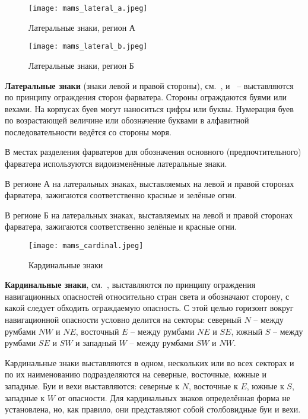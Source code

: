 \begin{figure}[htb]
  \centering{}
  \texttt{[image: mams\_lateral\_a.jpeg]}
  \caption{Латеральные знаки, регион А}
  \label{fig:mams-lateral-a}
\end{figure}

\begin{figure}[htb]
  \centering{}
  \texttt{[image: mams\_lateral\_b.jpeg]}
  \caption{Латеральные знаки, регион Б}
  \label{fig:mams-lateral-b}
\end{figure}

\textbf{Латеральные знаки} (знаки левой и
правой стороны), см.~, 
и~ \--- выставляются по принципу ограждения
сторон фарватера.  Стороны ограждаются буями или вехами. На корпусах
буев могут наноситься цифры или буквы. Нумерация буев по возрастающей
величине или обозначение буквами в алфавитной последовательности
ведётся со стороны моря.

В местах разделения фарватеров для обозначения основного
(предпочтительного) фарватера используются видоизменённые латеральные
знаки.

В регионе А на латеральных знаках, выставляемых на левой и правой
сторонах фарватера, зажигаются соответственно красные и зелёные огни.

В регионе Б на латеральных знаках, выставляемых на левой и правой
сторонах фарватера, зажигаются соответственно зелёные и красные огни.

\begin{figure}[htb]
  \centering{}
  \texttt{[image: mams\_cardinal.jpeg]}
  \caption{Кардинальные знаки}
  \label{fig:mams-cardinal}
\end{figure}

\textbf{Кардинальные знаки},
см.~, выставляются по принципу ограждения
навигационных опасностей относительно стран света и обозначают
сторону, с какой следует обходить ограждаемую опасность. С этой целью
горизонт вокруг навигационной опасности условно делится на секторы:
северный $N$ \--- между румбами $NW$ и $NE$, восточный $E$ \--- между румбами
$NE$ и $SE$, южный $S$ \--- между румбами $SE$ и $SW$ и западный $W$ \--- между
румбами $SW$ и $NW$.

Кардинальные знаки выставляются в одном, нескольких или во всех
секторах и по их наименованию подразделяются на северные, восточные,
южные и западные. Буи и вехи выставляются: северные к $N$, восточные к
$E$, южные к $S$, западные к $W$ от опасности.  Для кардинальных знаков
определённая форма не установлена, но, как правило, они представляют
собой столбовидные буи и вехи.

